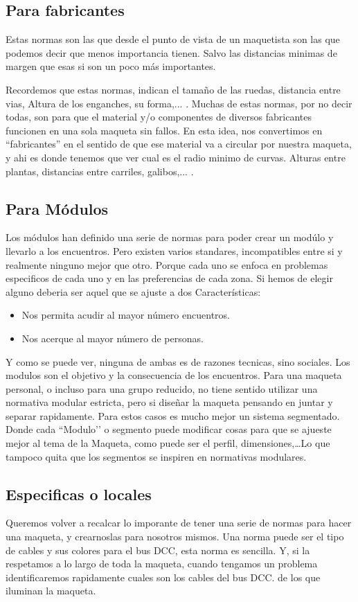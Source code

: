 \subsection{Para fabricantes}
Estas normas son las que desde el punto de vista de un maquetista son las que podemos decir que menos importancia tienen. Salvo las distancias minimas de margen que esas si son un poco más importantes.

Recordemos que estas normas, indican el tamaño de las ruedas, distancia entre vias, Altura de los enganches, su forma,... . Muchas de estas normas, por no decir todas, son para que el material y/o componentes de diversos fabricantes funcionen en una sola maqueta sin fallos. En esta idea, nos convertimos en ``fabricantes'' en el sentido de que ese material va a circular por nuestra maqueta, y ahi es donde tenemos que ver cual es el radio minimo de curvas.
Alturas entre plantas, distancias entre carriles, galibos,... .
\subsection{Para Módulos}
Los módulos han definido una serie de normas para poder crear un modúlo y llevarlo a los encuentros. Pero existen varios standares, incompatibles entre si y realmente ninguno mejor que otro. Porque cada uno se enfoca en problemas especificos de cada uno y en las preferencias de cada zona. Si hemos de elegir alguno deberia ser aquel que se ajuste a dos Características:
\begin{itemize}
	\item Nos permita acudir al mayor número encuentros.
	\item Nos acerque al mayor número de personas.
\end{itemize} 
Y como se puede ver, ninguna de ambas es de razones tecnicas, sino sociales. Los modulos son el objetivo y la consecuencia de los encuentros. Para una maqueta personal, o incluso para una grupo reducido, no tiene sentido utilizar una normativa modular estricta, pero si diseñar la maqueta pensando en juntar y separar rapidamente. Para estos casos es mucho mejor un sistema segmentado. Donde cada ``Modulo’’ o segmento puede modificar cosas para que se ajueste mejor al tema de la Maqueta, como puede ser el perfil, dimensiones,\dots Lo que tampoco quita que los segmentos se inspiren en normativas modulares.
\subsection{Especificas o locales}
Queremos volver a recalcar lo imporante de tener una serie de normas para hacer una maqueta, y crearnoslas para nosotros mismos. Una norma puede ser el tipo de cables y sus colores para el bus DCC, esta norma es sencilla. Y, si la respetamos a lo largo de toda la maqueta, cuando tengamos un problema identificaremos rapidamente cuales son los cables del bus DCC. de los que iluminan la maqueta.

